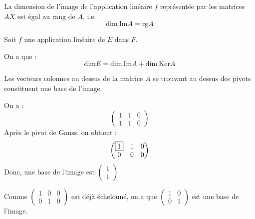 \documentclass[a4paper, titlepage]{article}
\begin{document}
	\begin{thm}
		La dimension de l'image de l'application linéaire $f$ représentée par les matrices $AX$ est égal au rang de $A$, i.e.
		$$ \mathrm{dim}~\mathrm{Im}A = \mathrm{rg}A $$
	\end{thm}
	\begin{thm}
		Soit $f$ une application linéaire de $E$ dans $F$.

		On a que :
		$$ \mathrm{dim}E = \mathrm{dim}~\mathrm{Im}A+\mathrm{dim}~\mathrm{Ker}A $$
	\end{thm}
	\begin{thm}
		Les vecteurs colonnes au dessus de la matrice $A$ se trouvant au dessus des pivots constituent une base de l'image.
	\end{thm}
	\begin{exemple}
		On a :
		$$ \begin{pmatrix} 1&1&0\\1&1&0 \end{pmatrix} $$
		Après le pivot de Gauss, on obtient :
		$$ \begin{pmatrix} \fbox{1}&1&0\\0&0&0 \end{pmatrix} $$
		Donc, une base de l'image est $\begin{pmatrix} 1\\1 \end{pmatrix} $

		Comme $\begin{pmatrix} 1&0&0\\0&1&0 \end{pmatrix}$ est déjà échelonné, on a que $\begin{pmatrix} 1&0\\0&1 \end{pmatrix}$ est une base de l'image.
	\end{exemple}
\end{document}
